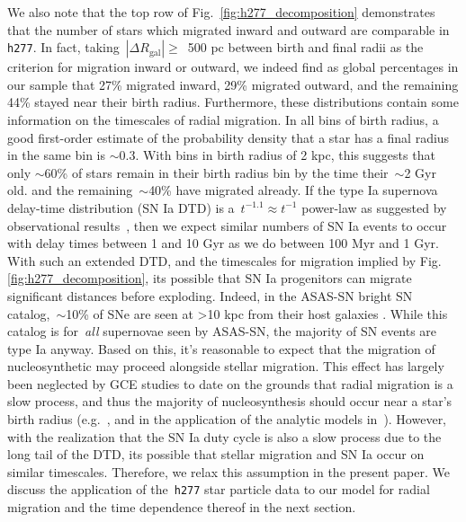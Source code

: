 \documentclass[fleqn, usenatbib]{mnras}
\begin{document}
We also note that the top row of Fig.~\ref{fig:h277_decomposition} demonstrates 
that the number of stars which migrated inward and outward are comparable in 
\texttt{h277}. In fact, taking~$\left|\Delta R_\text{gal}\right| \geq$~500 pc 
between birth and final radii as the criterion for migration inward or outward, 
we indeed find as global percentages in our sample that 27\% migrated inward, 
29\% migrated outward, and the remaining 44\% stayed near their birth radius. 
Furthermore, these distributions contain some information on the timescales of 
radial migration. In all bins of birth radius, a good first-order estimate of 
the probability density that a star has a final radius in the same bin is 
$\sim$0.3. With bins in birth radius of 2 kpc, this suggests that only 
$\sim$60\% of stars remain in their birth radius bin by the time their~$\sim$2 
Gyr old. and the remaining~$\sim$40\% have migrated already. If the type Ia 
supernova delay-time distribution (SN Ia DTD) is a~$t^{-1.1}\approx t^{-1}$ 
power-law as suggested by observational results~\citep[e.g.][]{Maoz2012, 
Maoz2017}, then we expect similar numbers of SN Ia events to occur with delay 
times between 1 and 10 Gyr as we do between 100 Myr and 1 Gyr. With such an 
extended DTD, and the timescales for migration implied by Fig. 
\ref{fig:h277_decomposition}, its possible that SN Ia progenitors can migrate 
significant distances before exploding. Indeed, in the ASAS-SN bright SN 
catalog,~$\sim$10\% of SNe are seen at >10 kpc from their host galaxies 
\citep{Holoien2019}. While this catalog is for~\textit{all} supernovae seen by 
ASAS-SN, the majority of SN events are type Ia anyway. Based on this, it's 
reasonable to expect that the migration of nucleosynthetic may proceed 
alongside stellar migration. This effect has largely been neglected by GCE 
studies to date on the grounds that radial migration is a slow process, and 
thus the majority of nucleosynthesis should occur near a star's birth radius 
(e.g.~\citealp{Minchev2013}, and in the application of the 
\citealt{Weinberg2017} analytic models in~\citealt{Feuillet2018}). However, 
with the realization that the SN Ia duty cycle is also a slow process due to 
the long tail of the DTD, its possible that stellar migration and SN Ia occur 
on similar timescales. Therefore, we relax this assumption in the present 
paper. We discuss the application of the~\texttt{h277} star particle data to 
our model for radial migration and the time dependence thereof in the next 
section. 
\end{document}
